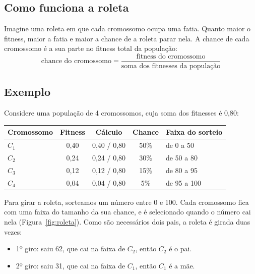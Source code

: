 \documentclass[11pt,a4paper]{article}
\newenvironment{tabela}{\par\nopagebreak[4]\vspace{0.3em}\nopagebreak[4]\begingroup\centering\small}{\par\endgroup\vspace{0.6em}}
\begin{document}
\subsection{Como funciona a roleta}

Imagine uma roleta em que cada cromossomo ocupa uma fatia. Quanto maior o fitness, maior a fatia e maior a chance de a roleta parar nela. A chance de cada cromossomo é a sua parte no fitness total da população:
\[
  \text{chance do cromossomo} = \frac{\text{fitness do cromossomo}}{\text{soma dos fitnesses da população}}
\]

\subsection{Exemplo}

Considere uma população de 4 cromossomos, cuja soma dos fitnesses é 0,80:

\begin{tabela}
\begin{tabular}{lcccl}
\toprule
Cromossomo & Fitness & Cálculo & Chance & Faixa do sorteio\\
\midrule
$C_1$ & 0,40 & 0,40 / 0,80 & 50\% & de 0 a 50\\
$C_2$ & 0,24 & 0,24 / 0,80 & 30\% & de 50 a 80\\
$C_3$ & 0,12 & 0,12 / 0,80 & 15\% & de 80 a 95\\
$C_4$ & 0,04 & 0,04 / 0,80 & 5\% & de 95 a 100\\
\bottomrule
\end{tabular}
\end{tabela}

Para girar a roleta, sorteamos um número entre 0 e 100. Cada cromossomo fica com uma faixa do tamanho da sua chance, e é selecionado quando o número cai nela (Figura~\ref{fig:roleta}). Como são necessários dois pais, a roleta é girada duas vezes:
\begin{itemize}
  \item 1º giro: saiu 62, que cai na faixa de $C_2$, então $C_2$ é o pai.
  \item 2º giro: saiu 31, que cai na faixa de $C_1$, então $C_1$ é a mãe.
\end{itemize}
\end{document}
